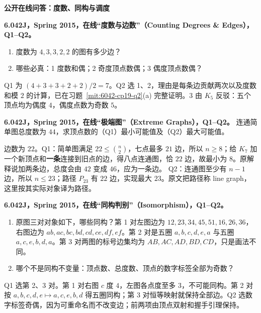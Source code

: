\par\addvspace{7pt}\noindent\textbf{公开在线问答：度数、同构与调度}\par
\begin{exercise}
\textbf{6.042J，Spring 2015，在线“度数与边数”（Counting Degrees \& Edges），Q1--Q2。}
\begin{enumerate}[label=Q\arabic*.]
\item\label{mit:6042-online-counting-degrees-and-edges-q1} 度数为 $4,3,3,2,2$ 的图有多少边？
\item\label{mit:6042-online-counting-degrees-and-edges-q2} 哪些必真：1 度数和偶；2 奇度顶点数偶；3 偶度顶点数偶？
\end{enumerate}
\end{exercise}
\begin{solution}
Q1 为 $(4+3+3+2+2)/2=7$。Q2 选 1、2，理由是每条边贡献两次以及度数和模 $2$ 的计算，已在习题~\ref{mit:6042-cp19-q2}(a) 完整证明。3 由 $K_5$ 反驳：五个顶点均为偶度 $4$，偶度点数为奇数 $5$。
\end{solution}

\begin{exercise}
\textbf{6.042J，Spring 2015，在线“极端图”（Extreme Graphs），Q1--Q2。}
连通简单图总度数为 $44$，求顶点数的（Q1）最小可能值及（Q2）最大可能值。
\label{mit:6042-online-extreme-graphs-q1}\label{mit:6042-online-extreme-graphs-q2}
\end{exercise}
\begin{solution}
边数为 $22$。Q1：简单图满足 $22\le\binom n2$，七点最多 $21$ 边，所以 $n\ge8$；给 $K_7$ 加一个新顶点和\textbf{一条}连接到旧点的边，得八点连通图，恰 $22$ 边，故最小为 $8$。原解释说加两条边，总度会由 $42$ 变成 $46$，应为一条边。
Q2：连通图至少有 $n-1$ 边，所以 $n\le23$；路径 $P_{23}$ 有 $22$ 边，实现最大 $23$。原文把路径称 line graph，这里按其实际对象译为路径。
\end{solution}

\begin{exercise}
\textbf{6.042J，Spring 2015，在线“同构判别”（Isomorphism），Q1--Q2。}
\begin{enumerate}[label=Q\arabic*.]
\item\label{mit:6042-online-isomorphism-q1} 原图三对对象如下，哪些同构？第 1 对左图边为 $12,23,34,45,51,16,26,36$，右图边为 $ab,ac,bc,bd,cd,ce,df,ef$。第 2 对是五圈 $a,b,c,d,e,a$ 与五圈 $a,c,e,b,d,a$。第 3 对两图的标号边集均为 $AB,AC,AD,BD,CD$，只是画法不同。
\item\label{mit:6042-online-isomorphism-q2} 哪个不是同构不变量：顶点数、总度数、顶点的数字标签全部为奇数？
\end{enumerate}
\end{exercise}
\begin{solution}
Q1 选第 2、3 对。第 1 对右图 $c$ 度 $4$，左图各点度至多 $3$，不可能同构。第 2 对按 $a,b,c,d,e\mapsto a,c,e,b,d$ 得五圈同构；第 3 对恒等映射就保持全部边。Q2 选数字标签奇偶，因为可重命名而不改变边；前两项由顶点双射和握手引理保持。
\end{solution}

